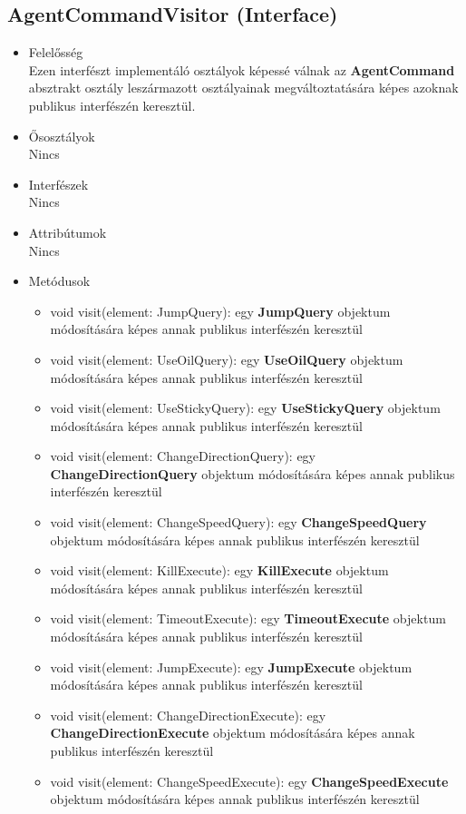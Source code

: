\subsection{AgentCommandVisitor (Interface)}
\begin{itemize}

\item Felelősség\\
    Ezen interfészt implementáló osztályok képessé válnak az \textbf{AgentCommand} absztrakt osztály leszármazott osztályainak megváltoztatására képes azoknak publikus interfészén keresztül.

\item Ősosztályok\\
Nincs

\item Interfészek\\
Nincs

\item Attribútumok\\
Nincs

\item Metódusok\\

\begin{itemize}
    \item void visit(element: JumpQuery): egy \textbf{JumpQuery} objektum módosítására képes annak publikus interfészén keresztül
    \item void visit(element: UseOilQuery): egy \textbf{UseOilQuery} objektum módosítására képes annak publikus interfészén keresztül
    \item void visit(element: UseStickyQuery): egy \textbf{UseStickyQuery} objektum módosítására képes annak publikus interfészén keresztül
    \item void visit(element: ChangeDirectionQuery): egy \textbf{ChangeDirectionQuery} objektum módosítására képes annak publikus interfészén keresztül
    \item void visit(element: ChangeSpeedQuery): egy \textbf{ChangeSpeedQuery} objektum módosítására képes annak publikus interfészén keresztül
    \item void visit(element: KillExecute): egy \textbf{KillExecute} objektum módosítására képes annak publikus interfészén keresztül
    \item void visit(element: TimeoutExecute): egy \textbf{TimeoutExecute} objektum módosítására képes annak publikus interfészén keresztül
    \item void visit(element: JumpExecute): egy \textbf{JumpExecute} objektum módosítására képes annak publikus interfészén keresztül
    \item void visit(element: ChangeDirectionExecute): egy \textbf{ChangeDirectionExecute} objektum módosítására képes annak publikus interfészén keresztül
    \item void visit(element: ChangeSpeedExecute): egy \textbf{ChangeSpeedExecute} objektum módosítására képes annak publikus interfészén keresztül
\end{itemize}

\end{itemize}


